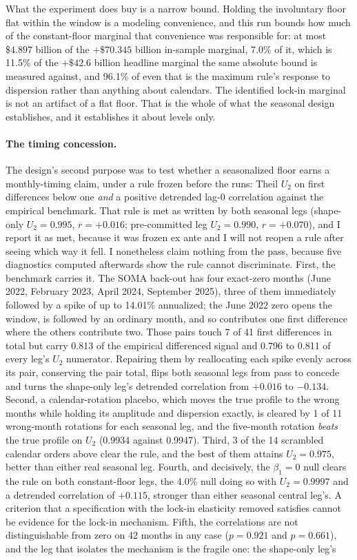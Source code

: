 \documentclass[12pt]{article}
\begin{document}
What the experiment does buy is a narrow bound. Holding the involuntary floor flat within the window is a modeling convenience, and this run bounds how much of the constant-floor marginal that convenience was responsible for: at most $\$4.897$ billion of the $+\$70.345$ billion in-sample marginal, 7.0\% of it, which is 11.5\% of the $+\$42.6$ billion headline marginal the same absolute bound is measured against, and 96.1\% of even that is the maximum rule's response to dispersion rather than anything about calendars. The identified lock-in marginal is not an artifact of a flat floor. That is the whole of what the seasonal design establishes, and it establishes it about levels only.

\paragraph{The timing concession.} The design's second purpose was to test whether a seasonalized floor earns a monthly-timing claim, under a rule frozen before the runs: Theil $U_2$ on first differences below one \emph{and} a positive detrended lag-0 correlation against the empirical benchmark. That rule is met as written by both seasonal legs (shape-only $U_2 = 0.995$, $r = +0.016$; pre-committed leg $U_2 = 0.990$, $r = +0.070$), and I report it as met, because it was frozen ex ante and I will not reopen a rule after seeing which way it fell. I nonetheless claim nothing from the pass, because five diagnostics computed afterwards show the rule cannot discriminate. First, the benchmark carries it. The SOMA back-out has four exact-zero months (June 2022, February 2023, April 2024, September 2025), three of them immediately followed by a spike of up to 14.01\% annualized; the June 2022 zero opens the window, is followed by an ordinary month, and so contributes one first difference where the others contribute two. Those pairs touch 7 of 41 first differences in total but carry 0.813 of the empirical differenced signal and 0.796 to 0.811 of every leg's $U_2$ numerator. Repairing them by reallocating each spike evenly across its pair, conserving the pair total, flips both seasonal legs from pass to concede and turns the shape-only leg's detrended correlation from $+0.016$ to $-0.134$. Second, a calendar-rotation placebo, which moves the true profile to the wrong months while holding its amplitude and dispersion exactly, is cleared by 1 of 11 wrong-month rotations for each seasonal leg, and the five-month rotation \emph{beats} the true profile on $U_2$ (0.9934 against 0.9947). Third, 3 of the 14 scrambled calendar orders above clear the rule, and the best of them attains $U_2 = 0.975$, better than either real seasonal leg. Fourth, and decisively, the $\beta_1 = 0$ null clears the rule on both constant-floor legs, the 4.0\% null doing so with $U_2 = 0.9997$ and a detrended correlation of $+0.115$, stronger than either seasonal central leg's. A criterion that a specification with the lock-in elasticity removed satisfies cannot be evidence for the lock-in mechanism. Fifth, the correlations are not distinguishable from zero on 42 months in any case ($p = 0.921$ and $p = 0.661$), and the leg that isolates the mechanism is the fragile one: the shape-only leg's 
\end{document}
